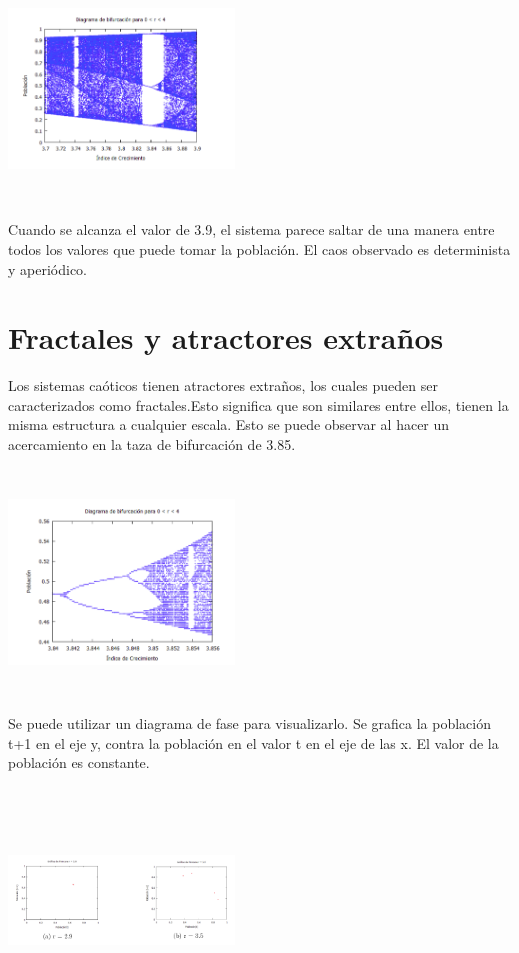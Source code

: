 \documentclass{article}
\begin{document}
\begin{center}
\includegraphics[width=6cm, height=6cm]{Im4.png}
\end{center}

Cuando se alcanza el valor de 3.9, el sistema parece saltar de una manera entre todos los valores que puede tomar la población.  El caos observado es determinista y aperiódico.

\section{Fractales y atractores extraños}

Los sistemas caóticos tienen atractores extraños, los cuales pueden ser caracterizados como fractales.Esto significa que son similares entre ellos, tienen la misma estructura a cualquier escala. Esto se puede observar al hacer un acercamiento en la taza de bifurcación de 3.85.

\begin{center}
\includegraphics[width=6cm, height=6cm]{Im5.png}
\end{center}

Se puede utilizar un diagrama de fase para visualizarlo. Se grafica la población t+1 en el eje y, contra la población en el valor t en el eje de las x. El valor de la población es constante. 

\begin{center}
\includegraphics[width=6cm, height=6cm]{Im6.png}
\end{center}
\end{document}
